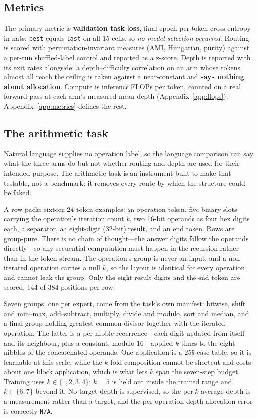 \subsection{Metrics}\label{sec:metrics} The primary metric is \textbf{validation task loss}, final-epoch per-token cross-entropy in nats; \texttt{best} equals \texttt{last} on all 15 cells, so \emph{no model selection occurred}. Routing is scored with permutation-invariant measures (AMI, Hungarian, purity) against a per-run shuffled-label control and reported as a z-score. Depth is reported with its exit rates alongside: a depth--difficulty correlation on an arm whose tokens almost all reach the ceiling is taken against a near-constant and \textbf{says nothing about allocation}. Compute is inference FLOPs per token, counted on a real forward pass at each arm's measured mean depth (Appendix~\ref{app:flops}). Appendix~\ref{app:metrics} defines the rest.


\subsection{The arithmetic task}
\label{sec:arith-task}

Natural language supplies no operation label, so the language comparison can say
what the three arms do but not whether routing and depth are used for their
intended purpose. The arithmetic task is an instrument built to make that
testable, not a benchmark: it removes every route by which the structure could be
faked.

A row packs sixteen 24-token examples: an operation token, five binary slots
carrying the operation's iteration count $k$, two 16-bit operands as four hex
digits each, a separator, an eight-digit (32-bit) result, and an end token. Rows
are group-pure. There is no chain of thought---the answer digits follow the
operands directly---so any sequential computation must happen in the recursion
rather than in the token stream. The operation's group is never an input, and a
non-iterated operation carries a null $k$, so the layout is identical for every
operation and cannot leak the group. Only the eight result digits and the end
token are scored, 144 of 384 positions per row.

Seven groups, one per expert, come from the task's own manifest: bitwise, shift
and min--max, add--subtract, multiply, divide and modulo, sort and median, and a
final group holding greatest-common-divisor together with the iterated operation.
The latter is a per-nibble recurrence---each digit updated from itself and its
neighbour, plus a constant, modulo 16---applied $k$ times to the eight nibbles of
the concatenated operands. One application is a $256$-case table, so it is
learnable at this scale, while the $k$-fold composition cannot be shortcut and
costs about one block application, which is what lets $k$ span the seven-step
budget. Training uses $k \in \{1,2,3,4\}$; $k = 5$ is held out inside the trained
range and $k \in \{6,7\}$ beyond it. No target depth is supervised, so the per-$k$
average depth is a measurement rather than a target, and the per-operation
depth-allocation error is correctly \texttt{N/A}.

